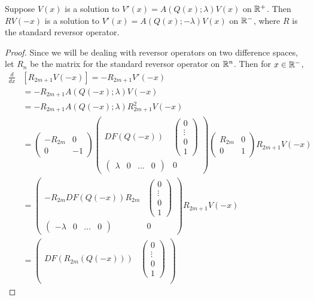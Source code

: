 \documentclass[thesis.tex]{subfiles}
\begin{document}
\begin{lemma}\label{Vlambdasymmetrylemma}
Suppose $V(x)$ is a solution to $V'(x) = A(Q(x); \lambda) V(x)$ on $\mathbb{R}^+$. Then $R V(-x)$ is a solution to $V'(x) = A(Q(x); -\lambda) V(x)$ on $\mathbb{R}^-$, where $R$ is the standard reversor operator.
\begin{proof}
Since we will be dealing with reversor operators on two difference spaces, let $R_{n}$ be the matrix for the standard reversor operator on $\mathbb{R}^n$. Then for $x \in \mathbb{R}^-$,
\begin{align*}
\frac{d}{dx} &\left[ R_{2m+1} V(-x) \right] = -R_{2m+1} V'(-x) \\
&= -R_{2m+1} A(Q(-x); \lambda) V(-x) \\
&= -R_{2m+1} A(Q(-x); \lambda) R_{2m+1}^2 V(-x) \\
&= \begin{pmatrix}-R_{2m} & 0 \\ 0 & -1 \end{pmatrix} 
\begin{pmatrix}
DF(Q(-x)) & \begin{pmatrix} 0 \\ \vdots \\ 0 \\ 1 \end{pmatrix} \\
\begin{pmatrix} \lambda & 0 & \dots & 0 \end{pmatrix} & 0
\end{pmatrix} \begin{pmatrix}R_{2m} & 0 \\ 0 & 1 \end{pmatrix}  R_{2m+1} V(-x) \\
&= \begin{pmatrix}
-R_{2m} DF(Q(-x)) R_{2m} & \begin{pmatrix} 0 \\ \vdots \\ 0 \\ 1 \end{pmatrix} \\
\begin{pmatrix} -\lambda & 0 & \dots & 0 \end{pmatrix} & 0
\end{pmatrix} R_{2m+1} V(-x) \\
&= \begin{pmatrix}
DF(R_{2m}(Q(-x))) & \begin{pmatrix} 0 \\ \vdots \\ 0 \\ 1 \end{pmatrix} \\

\end{pmatrix}
\end{align*}
\end{proof}
\end{lemma}
\end{document}
